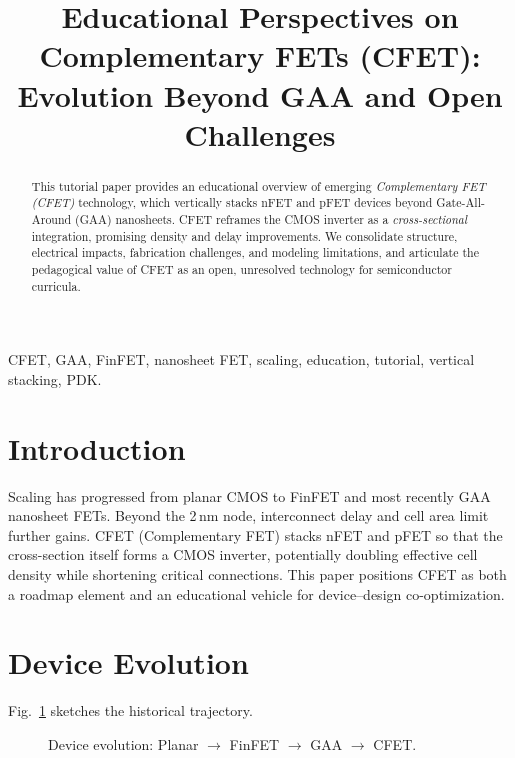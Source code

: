 \documentclass[conference]{IEEEtran}
\title{Educational Perspectives on Complementary FETs (CFET):\\
Evolution Beyond GAA and Open Challenges}
\author{
\IEEEauthorblockN{Shinichi Samizo}
\IEEEauthorblockA{Project Design Hub, Samizo-AITL\\
Email: samizo-aitl@example.com}
}
\begin{document}
\maketitle

\begin{abstract}
This tutorial paper provides an educational overview of emerging
\emph{Complementary FET (CFET)} technology, which vertically stacks
nFET and pFET devices beyond Gate-All-Around (GAA) nanosheets.
CFET reframes the CMOS inverter as a \emph{cross-sectional} integration,
promising density and delay improvements. We consolidate structure,
electrical impacts, fabrication challenges, and modeling limitations,
and articulate the pedagogical value of CFET as an open, unresolved
technology for semiconductor curricula.
\end{abstract}

\begin{IEEEkeywords}
CFET, GAA, FinFET, nanosheet FET, scaling, education, tutorial, vertical stacking, PDK.
\end{IEEEkeywords}

\section{Introduction}
Scaling has progressed from planar CMOS to FinFET and most recently
GAA nanosheet FETs. Beyond the 2\,nm node, interconnect delay and cell
area limit further gains. CFET (Complementary FET) stacks nFET and pFET
so that the cross-section itself forms a CMOS inverter, potentially
doubling effective cell density while shortening critical connections.
This paper positions CFET as both a roadmap element and an educational
vehicle for device--design co-optimization.

\section{Device Evolution}
Fig.~\ref{fig:evolution} sketches the historical trajectory.

\begin{figure}[t]
\centering
{}
\caption{Device evolution: Planar $\rightarrow$ FinFET $\rightarrow$ GAA $\rightarrow$ CFET.}
\label{fig:evolution}
\end{figure}
\end{document}
